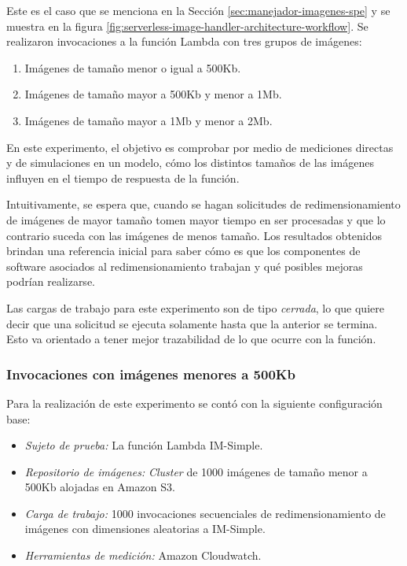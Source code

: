 Este es el caso que se menciona en la Sección \ref{sec:manejador-imagenes-spe} y se muestra en la figura \ref{fig:serverless-image-handler-architecture-workflow}. Se realizaron invocaciones a la función Lambda con tres grupos de imágenes:
\begin{enumerate}
    \item Imágenes de tamaño menor o igual a 500Kb.
    \item Imágenes de tamaño mayor a 500Kb y menor a 1Mb.
    \item Imágenes de tamaño mayor a 1Mb y menor a 2Mb.
\end{enumerate}
En este experimento, el objetivo es comprobar por medio de mediciones directas y de simulaciones en un modelo, cómo los distintos tamaños de las imágenes influyen en el tiempo de respuesta de la función.

Intuitivamente, se espera que, cuando se hagan solicitudes de redimensionamiento de imágenes de mayor tamaño tomen mayor tiempo en ser procesadas y que lo contrario suceda con las imágenes de menos tamaño. Los resultados obtenidos brindan una referencia inicial para saber cómo es que los componentes de software asociados al redimensionamiento trabajan y qué posibles mejoras podrían realizarse.

Las cargas de trabajo para este experimento son de tipo \emph{cerrada}, lo que quiere decir que una solicitud se ejecuta solamente hasta que la anterior se termina. Esto va orientado a tener mejor trazabilidad de lo que ocurre con la función.


\subsubsection{Invocaciones con imágenes menores a 500Kb}
Para la realización de este experimento se contó con la siguiente configuración base:
\begin{itemize}
    \item \emph{Sujeto de prueba:} La función Lambda IM-Simple.
    \item \emph{Repositorio de imágenes:} \emph{Cluster} de 1000 imágenes de tamaño menor a 500Kb alojadas en Amazon S3.     
    \item \emph{Carga de trabajo:} 1000 invocaciones secuenciales de redimensionamiento de imágenes con dimensiones aleatorias a IM-Simple.
    \item \emph{Herramientas de medición:} Amazon Cloudwatch.
\end{itemize}

